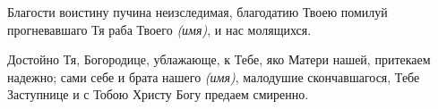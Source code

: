 \newpage

\begin{mymulticols}

\slava


Благости воистину пучина неизследимая, благодатию Твоею помилуй прогневавшаго Тя раба Твоего {\itshape (имя)}, и нас молящихся.


\inyne


Достойно Тя, Богородице, ублажающе, к Тебе, яко Матери нашей, притекаем надежно; сами себе и брата нашего {\itshape (имя)}, малодушие скончавшагося, Тебе Заступнице и с Тобою Христу Богу предаем смиренно.

\end{mymulticols}

\mychapterending

\begin{mymulticols}
 



\end{mymulticols}
